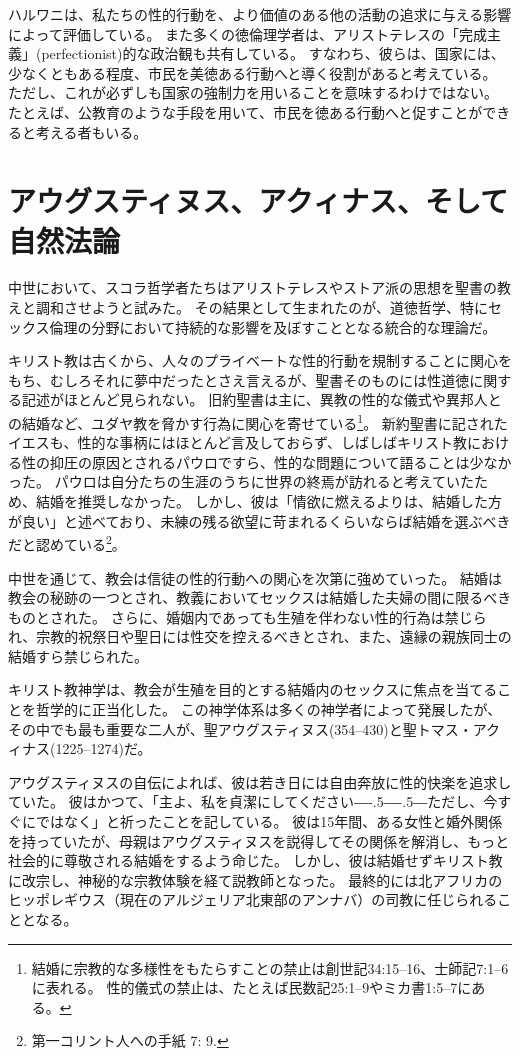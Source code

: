 \documentclass[paper=a4,book,openany]{jlreq}
\newcommand{\ig}[1]{}           %
\def\DDASH{―\kern-.5\zw―\kern-.5\zw―} %
\begin{document}
 ハルワニは、私たちの性的行動を、より価値のある他の活動の追求に与える影響によって評価している。
また多くの徳倫理学者は、アリストテレスの「完成主義」(perfectionist)的な政治観も共有している。
すなわち、彼らは、国家には、少なくともある程度、市民を美徳ある行動へと導く役割があると考えている。
ただし、これが必ずしも国家の強制力を用いることを意味するわけではない。
たとえば、公教育のような手段を用いて、市民を徳ある行動へと促すことができると考える者もいる。

\section{アウグスティヌス、アクィナス、そして自然法論}

中世において、スコラ哲学者たちはアリストテレスやストア派の思想を聖書の教えと調和させようと試みた。
その結果として生まれたのが、道徳哲学、特にセックス倫理の分野において持続的な影響を及ぼすこととなる統合的な理論だ。

キリスト教は古くから、人々のプライベートな性的行動を規制することに関心をもち、むしろそれに夢中だったとさえ言えるが、聖書そのものには性道徳に関する記述がほとんど見られない。
旧約聖書は主に、異教の性的な儀式や異邦人との結婚など、ユダヤ教を脅かす行為に関心を寄せている\footnote{結婚に宗教的な多様性をもたらすことの禁止は創世記34:15--16、士師記7:1--6に表れる。
性的儀式の禁止は、たとえば民数記25:1--9やミカ書1:5--7にある。
}。
新約聖書に記されたイエス\ig{イエス・キリスト}も、性的な事柄にはほとんど言及しておらず、しばしばキリスト教における性の抑圧の原因とされるパウロ\ig{聖パウロ}ですら、性的な問題について語ることは少なかった。
パウロは自分たちの生涯のうちに世界の終焉が訪れると考えていたため、結婚を推奨しなかった。
しかし、彼は「情欲に燃えるよりは、結婚した方が良い」と述べており、未練の残る欲望に苛まれるくらいならば結婚を選ぶべきだと認めている\footnote{第一コリント人への手紙 7: 9.}。

中世を通じて、教会は信徒の性的行動への関心を次第に強めていった。
結婚は教会の秘跡の一つとされ、教義においてセックスは結婚した夫婦の間に限るべきものとされた。
さらに、婚姻内であっても生殖を伴わない性的行為は禁じられ、宗教的祝祭日や聖日には性交を控えるべきとされ、また、遠縁の親族同士の結婚すら禁じられた。

キリスト教神学は、教会が生殖を目的とする結婚内のセックスに焦点を当てることを哲学的に正当化した。
この神学体系は多くの神学者によって発展したが、その中でも最も重要な二人が、聖アウグスティヌス(354--430)と聖トマス・アクィナス(1225--1274)だ。

アウグスティヌスの自伝によれば、彼は若き日には自由奔放に性的快楽を追求していた。
彼はかつて、「主よ、私を貞潔にしてください{\DDASH}ただし、今すぐにではなく」と祈ったことを記している。
彼は15年間、ある女性と婚外関係を持っていたが、母親はアウグスティヌスを説得してその関係を解消し、もっと社会的に尊敬される結婚をするよう命じた。
しかし、彼は結婚せずキリスト教に改宗し、神秘的な宗教体験を経て説教師となった。
最終的には北アフリカのヒッポレギウス（現在のアルジェリア北東部のアンナバ）の司教に任じられることとなる。
\end{document}
